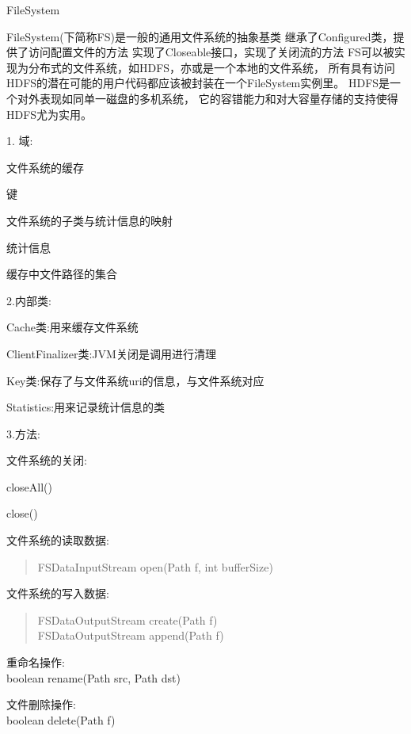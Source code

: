 \begin{XeClass}{FileSystem}
   
 FileSystem(下简称FS)是一般的通用文件系统的抽象基类
 继承了Configured类，提供了访问配置文件的方法
 实现了Closeable接口，实现了关闭流的方法
 FS可以被实现为分布式的文件系统，如HDFS，亦或是一个本地的文件系统，
 所有具有访问HDFS的潜在可能的用户代码都应该被封装在一个FileSystem实例里。
 HDFS是一个对外表现如同单一磁盘的多机系统，
 它的容错能力和对大容量存储的支持使得HDFS尤为实用。
 
 1. 域:
 \begin{XeEnum}
 \item 文件系统的缓存
 \item 键
 \item 文件系统的子类与统计信息的映射
 \item 统计信息
 \item 缓存中文件路径的集合
 \end{XeEnum}
 
 2.内部类:
 \begin{XeEnum}
 \item Cache类:用来缓存文件系统
 \item ClientFinalizer类:JVM关闭是调用进行清理
 \item Key类:保存了与文件系统uri的信息，与文件系统对应
 \item Statistics:用来记录统计信息的类
 \end{XeEnum}
 
 3.方法:
 
 文件系统的关闭:
 \begin{XeEnum}
 \item closeAll()
 \item close()
 \end{XeEnum}
 
 文件系统的读取数据:
 \begin{quote}
 FSDataInputStream open(Path f, int bufferSize)
 \end{quote}
 
 文件系统的写入数据:
 \begin{quote}
 FSDataOutputStream create(Path f) \\
 FSDataOutputStream append(Path f) 
 \end{quote}
 
 重命名操作: \\
 boolean rename(Path src, Path dst)
 
 文件删除操作: \\
 boolean delete(Path f)
 

\end{XeClass}
